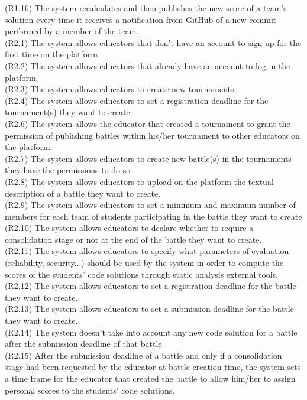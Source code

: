 (R1.16) The system recalculates and then publishes the new score of a team's solution every time it receives a notification from GitHub of a new commit performed by a member of the team.  \\
(R2.1) The system allows educators that don’t have an account to sign up for the first time on the platform. \\
(R2.2) The system allows educators that already have an account to log in the platform. \\
(R2.3) The system allows educators to create new tournaments.  \\
(R2.4) The system allows educators to set a registration deadline for the tournament(s) they want to create  \\
(R2.6) The system allows the educator that created a tournament to grant the permission of publishing battles within his/her tournament to other educators on the platform. \\
(R2.7) The system allows educators to create new battle(s) in the tournaments they have the permissions to do so \\
(R2.8) The system allows educators to upload on the platform the textual description of a battle they want to create.  \\
(R2.9) The system allows educators to set a minimum and maximum number of members for each team of students participating in the battle they want to create  \\
(R2.10) The system allows educators to declare whether to require a consolidation stage or not at the end of the battle they want to create.  \\
(R2.11) The system allows educators to specify what parameters of evaluation (reliability, security...) should be used by the system in order to compute the scores of the students' code solutions through static analysis external tools.  \\
(R2.12) The system allows educators to set a registration deadline for the battle they want to create.  \\
(R2.13) The system allows educators to set a submission deadline for the battle they want to create.  \\
(R2.14) The system doesn't take into account any new code solution for a battle after the submission deadline of that battle.  \\
(R2.15) After the submission deadline of a battle and only if a consolidation stage had been requested by the educator at battle creation time, the system sets a time frame for the educator that created the battle to allow him/her to assign personal scores to the students’ code solutions.  \\
